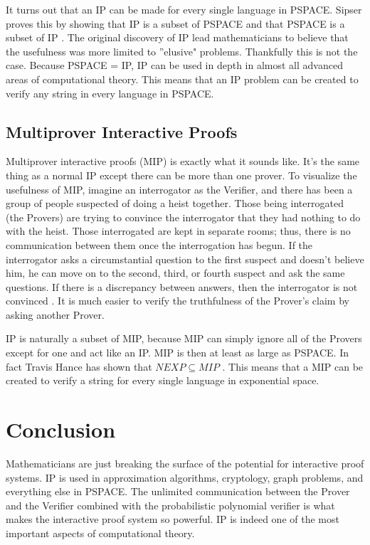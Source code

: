\documentclass[12pt]{article}
\begin{document}
It turns out that an IP can be made for every single language in PSPACE. Sipser proves this by showing that IP is a subset of PSPACE and that PSPACE is a subset of IP \cite{sipser}. The original discovery of IP lead mathematicians to believe that the usefulness was more limited to ''elusive" problems. Thankfully this is not the case. Because PSPACE = IP, IP can be used in depth in almost all advanced areas of computational theory. This means that an IP problem can be created to verify any string in every language in PSPACE.

\subsection{Multiprover Interactive Proofs}
Multiprover interactive proofs (MIP) is exactly what it sounds like. It's the same thing as a normal IP except there can be more than one prover. To visualize the usefulness of MIP, imagine an interrogator as the Verifier, and there has been a group of people suspected of doing a heist together. Those being interrogated (the Provers) are trying to convince the interrogator that they had nothing to do with the heist. Those interrogated are kept in separate rooms; thus, there is no communication between them once the interrogation has begun. If the interrogator asks a circumstantial question to the first suspect and doesn't believe him, he can move on to the second, third, or fourth suspect and ask the same questions. If there is a discrepancy between answers, then the interrogator is not convinced \cite{ips}. It is much easier to verify the truthfulness of the Prover's claim by asking another Prover.

IP is naturally a subset of MIP, because MIP can simply ignore all of the Provers except for one and act like an IP. MIP is then at least as large as PSPACE. In fact Travis Hance has shown that $NEXP \subseteq MIP$ \cite{mip}. This means that a MIP can be created to verify a string for every single language in exponential space. 

\section{Conclusion}

Mathematicians are just breaking the surface of the potential for interactive proof systems. IP is used in approximation algorithms, cryptology, graph problems, and everything else in PSPACE. The unlimited communication between the Prover and the Verifier combined with the probabilistic polynomial verifier is what makes the interactive proof system so powerful. IP is indeed one of the most important aspects of computational theory.



\end{document}
